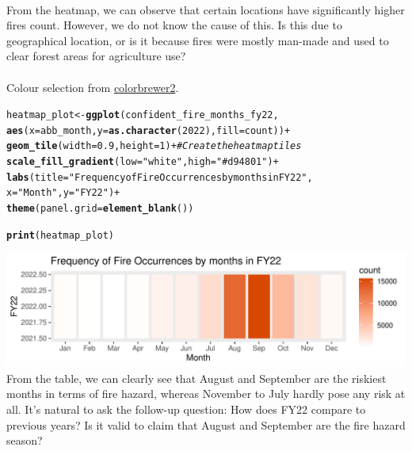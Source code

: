 \documentclass{article}\usepackage[]{graphicx}\usepackage[]{xcolor}
\makeatletter
\def\maxwidth{ %
  \ifdim\Gin@nat@width>\linewidth
    \linewidth
  \else
    \Gin@nat@width
  \fi
}
\newcommand{\hlnum}[1]{\textcolor[rgb]{0.686,0.059,0.569}{#1}}%
\newcommand{\hlstr}[1]{\textcolor[rgb]{0.192,0.494,0.8}{#1}}%
\newcommand{\hlcom}[1]{\textcolor[rgb]{0.678,0.584,0.686}{\textit{#1}}}%
\newcommand{\hlopt}[1]{\textcolor[rgb]{0,0,0}{#1}}%
\newcommand{\hlstd}[1]{\textcolor[rgb]{0.345,0.345,0.345}{#1}}%
\newcommand{\hlkwb}[1]{\textcolor[rgb]{0.69,0.353,0.396}{#1}}%
\newcommand{\hlkwc}[1]{\textcolor[rgb]{0.333,0.667,0.333}{#1}}%
\newcommand{\hlkwd}[1]{\textcolor[rgb]{0.737,0.353,0.396}{\textbf{#1}}}%
\newenvironment{kframe}{%
 \def\at@end@of@kframe{}%
 \ifinner\ifhmode%
  \def\at@end@of@kframe{\end{minipage}}%
  \begin{minipage}{\columnwidth}%
 \fi\fi%
 \def\FrameCommand##1{\hskip\@totalleftmargin \hskip-\fboxsep
 \colorbox{shadecolor}{##1}\hskip-\fboxsep
     \hskip-\linewidth \hskip-\@totalleftmargin \hskip\columnwidth}%
 \MakeFramed {\advance\hsize-\width
   \@totalleftmargin\z@ \linewidth\hsize
   \@setminipage}}%
 {\par\unskip\endMakeFramed%
 \at@end@of@kframe}
\newenvironment{knitrout}{}{} %
\makeatother
\begin{document}
\\From the heatmap, we can observe that certain locations have significantly higher fires count. However, we do not know the cause of this. Is this due to geographical location, or is it because fires were mostly man-made and used to clear forest areas for agriculture use?
\\  
\\Colour selection from \href{https://colorbrewer2.org/#type=sequential&scheme=Oranges&n=9}{colorbrewer2}.



\begin{knitrout}
\color{fgcolor}\begin{kframe}
\begin{alltt}
\hlstd{heatmap_plot} \hlkwb{<-} \hlkwd{ggplot}\hlstd{(confident_fire_months_fy22,}
                       \hlkwd{aes}\hlstd{(}\hlkwc{x} \hlstd{= abb_month,} \hlkwc{y} \hlstd{=} \hlkwd{as.character}\hlstd{(}\hlnum{2022}\hlstd{),} \hlkwc{fill} \hlstd{= count))} \hlopt{+}
  \hlkwd{geom_tile}\hlstd{(}\hlkwc{width} \hlstd{=} \hlnum{0.9}\hlstd{,} \hlkwc{height} \hlstd{=} \hlnum{1}\hlstd{)} \hlopt{+}  \hlcom{# Create the heatmap tiles}
  \hlkwd{scale_fill_gradient}\hlstd{(}\hlkwc{low} \hlstd{=} \hlstr{"white"}\hlstd{,} \hlkwc{high} \hlstd{=} \hlstr{"#d94801"}\hlstd{)} \hlopt{+}
  \hlkwd{labs}\hlstd{(}\hlkwc{title} \hlstd{=} \hlstr{"Frequency of Fire Occurrences by months in FY22"}\hlstd{,}
       \hlkwc{x} \hlstd{=} \hlstr{"Month"}\hlstd{,} \hlkwc{y} \hlstd{=} \hlstr{"FY22"}\hlstd{)} \hlopt{+}
  \hlkwd{theme}\hlstd{(}\hlkwc{panel.grid} \hlstd{=} \hlkwd{element_blank}\hlstd{() )}

\hlkwd{print}\hlstd{(heatmap_plot)}
\end{alltt}
\end{kframe}
\includegraphics[width=\maxwidth]{figure/fire-by-months_fy22-1} 
\end{knitrout}
From the table, we can clearly see that August and September are the riskiest months in terms of fire hazard, whereas November to July hardly pose any risk at all. It's natural to ask the follow-up question: How does FY22 compare to previous years? Is it valid to claim that August and September are the fire hazard season?
\end{document}
